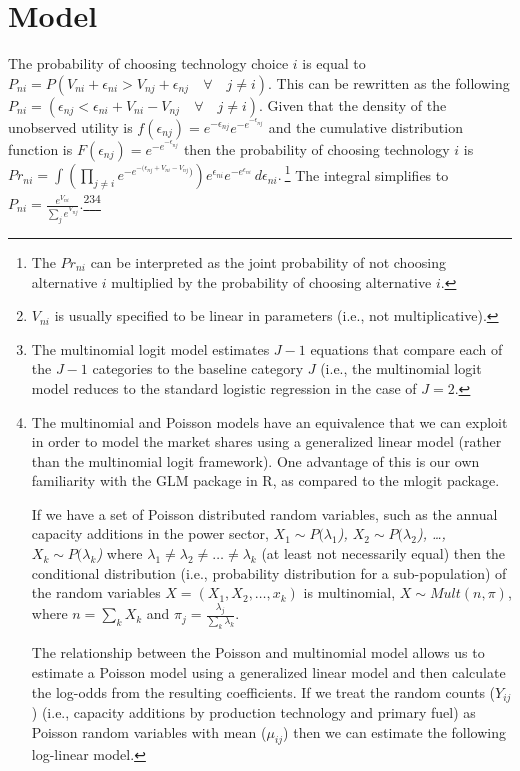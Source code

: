 \documentclass[10pt]{amsart}
\begin{document}
\section{Model}
The probability of choosing technology choice $i$ is equal to $P_{ni} = P(V_{ni} + \epsilon_{ni} > V_{nj} + \epsilon_{nj} \quad \forall \quad j \neq i)$. 
This can be rewritten as the following $P_{ni} = (\epsilon_{nj} <  \epsilon_{ni} + V_{ni} - V_{nj} \quad \forall \quad j \neq i)$.
Given that the density of the unobserved utility is $f(\epsilon_{nj}) = e^{-\epsilon_{nj}}e^{-e^{-\epsilon_{nj}}}$ and the cumulative distribution function is $F(\epsilon_{nj}) = e^{-e^{-\epsilon_{nj}}}$ then the probability of choosing technology $i$ is $Pr_{ni} = \int \left(\prod_{j \neq i} e^{-e^{-(\epsilon_{nj} + V_{ni} - V_{nj}})}\right)e^{\epsilon_{ni}}e^{-e^{\epsilon_{ni}}} \,d\epsilon_{ni}.\ $\footnote{The $Pr_{ni}$ can be interpreted as the joint probability of not choosing alternative $i$ multiplied by the probability of choosing alternative $i$.} 
The integral simplifies to $P_{ni} = \frac{e^{V_{ni}}}{\sum_{j} e^{V_{nj}}}$.\footnote{$V_{ni}$ is usually specified to be linear in parameters (i.e., not multiplicative).}\footnote{The multinomial logit model estimates $J - 1$ equations that compare each of the $J - 1$ categories to the baseline category $J$ (i.e., the multinomial logit model reduces to the standard logistic regression in the case of $J=2$.}\footnote{The multinomial and Poisson models have an equivalence that we can exploit in order to model the market shares using a generalized linear model (rather than the multinomial logit framework).
One advantage of this is our own familiarity with the GLM package in R, as compared to the mlogit package. 

If we have a set of Poisson distributed random variables, such as the annual capacity additions in the power sector, \textit{$X_1 \sim P(\lambda_1$), $X_2 \sim P(\lambda_2$), \ldots, $X_k \sim P(\lambda_k$)} where $\lambda_1 \neq \lambda_2 \neq \ldots \neq \lambda_k$ (at least not necessarily equal) then the conditional distribution (i.e., probability distribution for a sub-population) of the random variables \textit{$X = (X_1, X_2, \ldots, x_k)$} is multinomial, $X \sim Mult(n, \pi)$, where \textit{$n = \sum_k X_k$} and \textit{$\pi_j = \frac{\lambda_j}{\sum_k \lambda_k}$}. 

The relationship between the Poisson and multinomial model allows us to estimate a Poisson model using a generalized linear model and then calculate the log-odds from the resulting coefficients. 
If we treat the random counts ($Y_{ij}$) (i.e., capacity additions by production technology and primary fuel) as Poisson random variables with mean ($\mu_{ij}$) then we can estimate the following log-linear model.}
\end{document}
